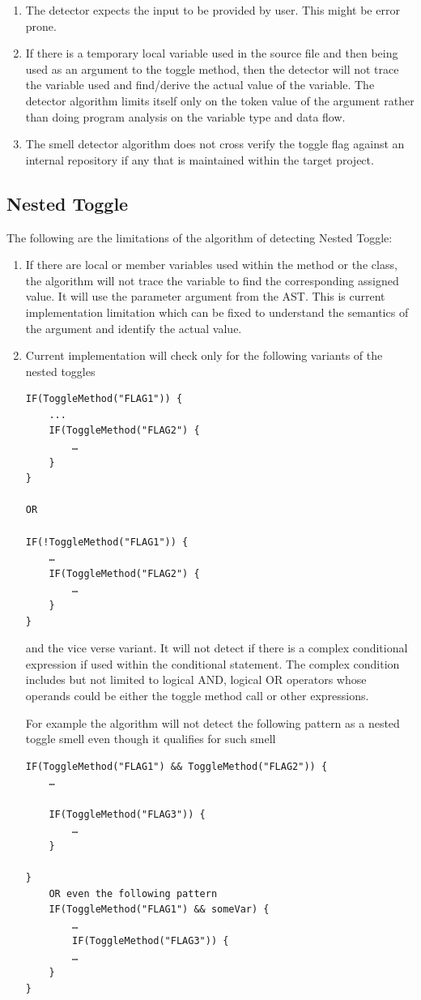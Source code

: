 \documentclass[conference]{IEEEtran}
\begin{document}
\begin{enumerate}
\item{The detector expects the input to be provided by user. This might be error prone.}
	
\item{If there is a temporary local variable used in the source file and then being used as an argument to the toggle method, then the detector will not trace the variable used and find/derive the actual value of the variable. The detector algorithm limits itself only on the token value of the argument rather than doing program analysis on the variable type and data flow.}
	
\item{The smell detector algorithm does not cross verify the toggle flag against an internal repository if any that is maintained within the target project.}
\end{enumerate}

\subsection{Nested Toggle}
The following are the limitations of the algorithm of detecting Nested Toggle:
\begin{enumerate}
\item{If there are local or member variables used within the method or the class, the algorithm will not trace the variable to find the corresponding assigned value. It will use the parameter argument from the AST. This is current implementation limitation which can be fixed to understand the semantics of the argument and identify the actual value.}
\item{Current implementation will check only for the following variants of the nested toggles

\begin{lstlisting}
IF(ToggleMethod("FLAG1")) {
	...
	IF(ToggleMethod("FLAG2") {
		…
	}
}

OR

IF(!ToggleMethod("FLAG1")) {
	…
	IF(ToggleMethod("FLAG2") {
		…
	}
}\end{lstlisting}

and the vice verse variant. It will not detect if there is a complex conditional expression if used within the conditional statement. The complex condition includes but not limited to logical AND, logical OR operators whose operands could be either the toggle method call or other expressions. 

For example the algorithm will not detect the following pattern as a nested toggle smell even though it qualifies for such smell
\begin{lstlisting}
IF(ToggleMethod("FLAG1") && ToggleMethod("FLAG2")) {
	…

	IF(ToggleMethod("FLAG3")) {
		…
	}

}	
	OR even the following pattern
	IF(ToggleMethod("FLAG1") && someVar) {
		…
		IF(ToggleMethod("FLAG3")) {
		…
	}
}
\end{lstlisting}
}
\end{enumerate}
\end{document}
